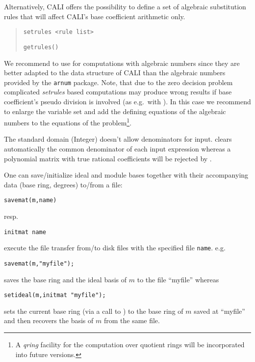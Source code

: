 Alternatively, CALI offers the possibility to define a set of
algebraic substitution rules that will affect CALI's base coefficient
arithmetic only. 
\begin{quote}
\verb|setrules <rule list>|


\verb|getrules()|

\end{quote}

We recommend to use  for computations with algebraic 
numbers since they are better adapted to the data structure of CALI 
than the algebraic numbers provided by the {\tt arnum} package. 
Note, that due to the zero decision problem
complicated {\em setrules} based computations may produce wrong
results if base coefficient's pseudo division is involved (as e.g.\
with ). In this case we recommend to enlarge
the variable set and add the defining equations of the algebraic
numbers to the equations of the problem\footnote{A {\em qring}
facility for the computation over quotient rings will be incorporated
into future versions.}.
\medskip

The standard domain (Integer) doesn't allow denominators for input.
\ind{setideal} clears automatically the common denominator of each
input expression whereas a polynomial matrix with true rational
coefficients will be rejected by .
\medskip

One can save/initialize ideal and module bases together with their
accompanying data (base ring, degrees) to/from a file:
\begin{verbatim}
savemat(m,name)
\end{verbatim}
resp.
\begin{verbatim}
initmat name
\end{verbatim} execute the file transfer from/to disk files with the
specified file {\tt name}. e.g.\
\begin{verbatim}
savemat(m,"myfile");
\end{verbatim}
saves the base ring and the ideal basis of $m$ to the file ``myfile''
whereas
\begin{verbatim}
setideal(m,initmat "myfile");
\end{verbatim}
sets the current base ring (via a call to ) to the base
ring of $m$ saved at ``myfile'' and then recovers the basis of $m$
from the same file.

